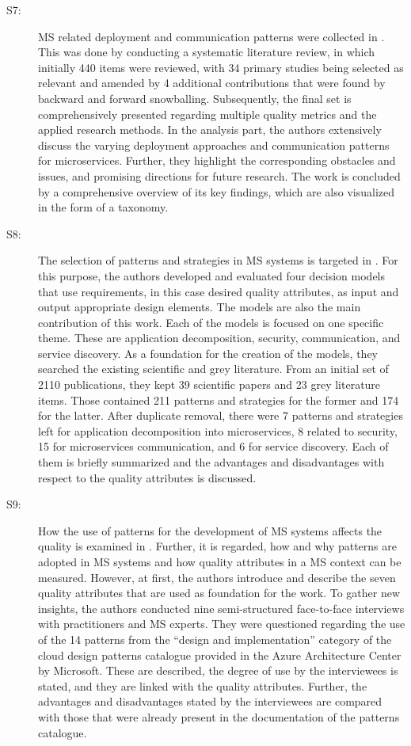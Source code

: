 \documentclass{bmcart}
\begin{document}
\begin{description}
  \item[S7:] MS related deployment and communication patterns were collected in \cite{aksakalli2021deployment}. This was done by conducting a systematic literature review, in which initially 440 items were reviewed, with 34 primary studies being selected as relevant and amended by 4 additional contributions that were found by backward and forward snowballing. Subsequently, the final set is comprehensively presented regarding multiple quality metrics and the applied research methods. In the analysis part, the authors extensively discuss the varying deployment approaches and communication patterns for microservices. Further, they highlight the corresponding obstacles and issues, and promising directions for future research. The work is concluded by a comprehensive overview of its key findings, which are also visualized in the form of a taxonomy. 
  \item[S8:] The selection of patterns and strategies in MS systems is targeted in \cite{Waseem.2022}. For this purpose, the authors developed and evaluated four decision models that use requirements, in this case desired quality attributes, as input and output appropriate design elements. The models are also the main contribution of this work. Each of the models is focused on one specific theme. These are application decomposition, security, communication, and service discovery. As a foundation for the creation of the models, they searched the existing scientific and grey literature. From an initial set of 2110 publications, they kept 39 scientific papers and 23 grey literature items. Those contained 211 patterns and strategies for the former and 174 for the latter. After duplicate removal, there were 7 patterns and strategies left for application decomposition into microservices, 8 related to security, 15 for microservices communication, and 6 for service discovery. Each of them is briefly summarized and the advantages and disadvantages with respect to the quality attributes is discussed.
  \item[S9:] How the use of patterns for the development of MS systems affects the quality is examined in \cite{Vale.2022}. Further, it is regarded, how and why patterns are adopted in MS systems and how quality attributes in a MS context can be measured. However, at first, the authors introduce and describe the seven quality attributes that are used as foundation for the work. To gather new insights, the authors conducted nine semi-structured face-to-face interviews with practitioners and MS experts. They were questioned regarding the use of the 14 patterns from the “design and implementation” category of the cloud design patterns catalogue \cite{AAC.2022} provided in the Azure Architecture Center by Microsoft. These are described, the degree of use by the interviewees is stated, and they are linked with the quality attributes. Further, the advantages and disadvantages stated by the interviewees are compared with those that were already present in the documentation of the patterns catalogue.

\end{description}
\end{document}
